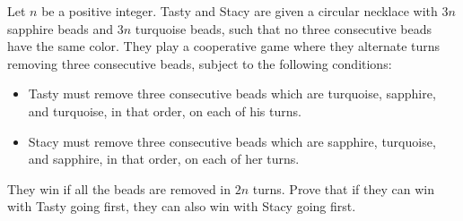 Let $n$ be a positive integer. Tasty and Stacy are given a circular necklace with $3n$ sapphire beads and $3n$ turquoise beads, such that no three consecutive beads have the same color. They play a cooperative game where they alternate turns removing three consecutive beads, subject to the following conditions: 
\begin{itemize}
	\item Tasty must remove three consecutive beads which are turquoise, sapphire, and turquoise, in that order, on each of his turns. 
	\item Stacy must remove three consecutive beads which are sapphire, turquoise, and sapphire, in that order, on each of her turns.
\end{itemize}
They win if all the beads are removed in $2n$ turns. Prove that if they can win with Tasty going first, they can also win with Stacy going first.